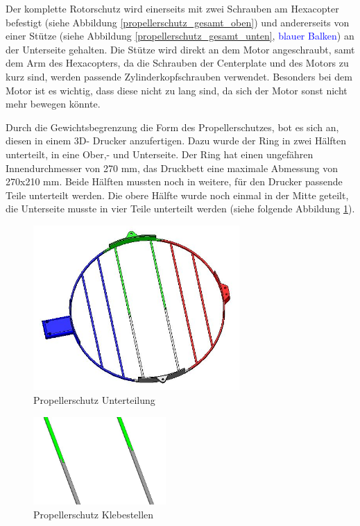 	Der komplette Rotorschutz wird einerseits mit zwei Schrauben am Hexacopter befestigt (siehe Abbildung \ref{propellerschutz_gesamt_oben}) und andererseits von einer Stütze (siehe Abbildung  \ref{propellerschutz_gesamt_unten},
	\textcolor{blue}{blauer Balken}) an der Unterseite gehalten.
	Die Stütze wird direkt an dem Motor angeschraubt, samt dem Arm des Hexacopters, da die Schrauben der Centerplate und des Motors zu kurz sind, werden passende Zylinderkopfschrauben verwendet.
	Besonders bei dem Motor ist es wichtig, dass diese nicht zu lang sind, da sich der Motor sonst nicht mehr bewegen könnte.

	Durch die Gewichtsbegrenzung \bzw die Form des Propellerschutzes, bot es sich an, diesen in einem 3D- Drucker anzufertigen.
	Dazu wurde der Ring in zwei Hälften unterteilt, in eine Ober,- und Unterseite.
	Der Ring hat einen ungefähren Innendurchmesser von 270 mm, das Druckbett eine maximale Abmessung von 270x210 mm.
	Beide Hälften mussten noch in weitere, für den Drucker passende Teile unterteilt werden.
	Die obere Hälfte wurde noch einmal in der Mitte geteilt, die Unterseite musste in vier Teile unterteilt werden (siehe folgende Abbildung \ref{propellerschutz_mitte_unterteilung}).

			\begin{figure}[tbh]
			\begin{centering}
			\includegraphics[width = 0.7\textwidth]{Bilder/propellerschutz_mitte_unterteilung}
			\par\end{centering}
			\caption{Propellerschutz Unterteilung}
			\label{propellerschutz_mitte_unterteilung}
			\end{figure}

			\begin{figure}[H]
			\begin{centering}
			\includegraphics[width = 0.45\textwidth]{Bilder/propellerschutz_klebestellen}
			\par\end{centering}
			\caption{Propellerschutz Klebestellen}
			\label{propellerschutz_klebestellen}
			\end{figure}

